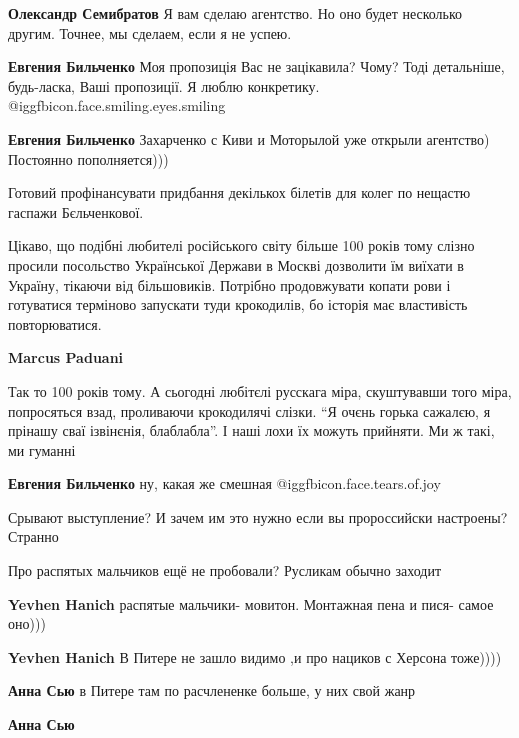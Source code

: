 \begin{itemize}
\begin{itemize}
\textbf{Олександр Семибратов} Я вам сделаю агентство. Но оно будет несколько другим. Точнее, мы сделаем, если я не успею.

\textbf{Евгения Бильченко} Моя пропозиція Вас не зацікавила? Чому? Тоді детальніше, будь-ласка, Ваші пропозиції. Я люблю конкретику. @igg{fbicon.face.smiling.eyes.smiling} 

\textbf{Евгения Бильченко} Захарченко с Киви и Моторылой уже открыли агентство) Постоянно пополняется)))

Готовий профінансувати придбання декількох білетів для колег по нещастю гаспажи Бєльченкової.


Цікаво, що подібні любителі російського світу більше 100 років тому слізно
просили посольство Української Держави в Москві дозволити їм виїхати в Україну,
тікаючи від більшовиків. Потрібно продовжувати копати рови і готуватися
терміново запускати туди крокодилів, бо історія має властивість повторюватися.

\textbf{Marcus Paduani} 

Так то 100 років тому. А сьогодні любітєлі русскага міра, скуштувавши того
міра, попросяться взад, проливаючи крокодилячі слізки. \enquote{Я очєнь горька сажалєю,
я прінашу сваї ізвінєнія, блаблабла}. І наші лохи їх можуть прийняти. Ми ж
такі, ми гуманні

\textbf{Евгения Бильченко} ну, какая же смешная  @igg{fbicon.face.tears.of.joy} 

\end{itemize} %

Срывают выступление? И зачем им это нужно если вы пророссийски настроены? Странно

Про распятых мальчиков ещё не пробовали? Русликам обычно заходит

\begin{itemize} %
\textbf{Yevhen Hanich} распятые мальчики- мовитон. Монтажная пена и пися- самое оно)))

\textbf{Yevhen Hanich} В Питере не зашло видимо ,и про нациков с Херсона тоже))))

\textbf{Анна Сью} в Питере там по расчлененке больше, у них свой жанр

\textbf{Анна Сью} 


\end{itemize}
\end{itemize}
